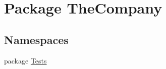 \hypertarget{namespace_the_company}{}\section{Package The\+Company}
\label{namespace_the_company}
\subsection*{Namespaces}
\begin{DoxyCompactItemize}
\item 
package \hyperlink{namespace_the_company_1_1_tests}{Tests}
\end{DoxyCompactItemize}
